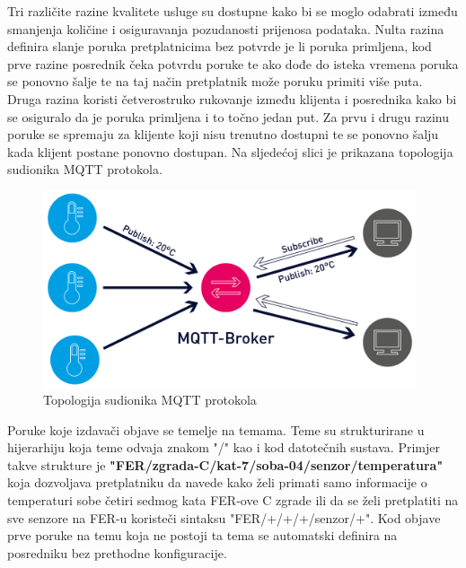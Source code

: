 \documentclass[times, utf8, diplomski]{fer}
\begin{document}
Tri različite razine kvalitete usluge su dostupne kako bi se moglo odabrati između smanjenja količine i osiguravanja pozudanosti prijenosa podataka. Nulta razina definira slanje poruka pretplatnicima bez potvrde je li poruka primljena, kod prve razine posrednik čeka potvrdu poruke te ako dođe do isteka vremena poruka se ponovno šalje te na taj način pretplatnik može poruku primiti više puta. Druga razina koristi četverostruko rukovanje između klijenta i posrednika kako bi se osiguralo da je poruka primljena i to točno jedan put. Za prvu i drugu razinu poruke se spremaju za klijente koji nisu trenutno dostupni te se ponovno šalju kada klijent postane ponovno dostupan. Na sljedećoj slici je prikazana topologija sudionika MQTT protokola.
\begin{figure}[htb]
    \centering
    \includegraphics[width=11cm]{images/mqtt.png}
    \caption{Topologija sudionika MQTT protokola\citep{MQTT}}
    \label{fig:mqtt}
\end{figure}

Poruke koje izdavači objave se temelje na temama. Teme su strukturirane u hijerarhiju koja teme odvaja znakom "/" kao i kod datotečnih sustava. Primjer takve strukture je \textbf{"FER/zgrada-C/kat-7/soba-04/senzor/temperatura"} koja dozvoljava pretplatniku da navede kako želi primati samo informacije o temperaturi sobe četiri sedmog kata FER-ove C zgrade ili da se želi pretplatiti na sve senzore na FER-u koristeči sintaksu "FER/+/+/+/senzor/+". Kod objave prve poruke na temu koja ne postoji ta tema se automatski definira na posredniku bez prethodne konfiguracije.
\end{document}
